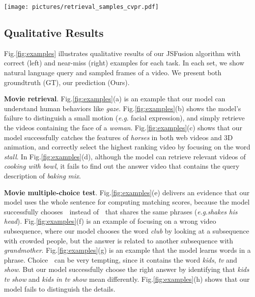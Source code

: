 \documentclass[runningheads]{llncs}
\makeatletter
\DeclareRobustCommand\onedot{\futurelet\@let@token\@onedot}
\def\onedot{.\@\xspace}
\def\eg{\textit{e.g}\onedot} \def\Eg{\textit{E.g}\onedot}
\makeatother
\begin{document}
\begin{figure*}[!t]
\centering
\texttt{[image: pictures/retrieval\_samples\_cvpr.pdf]}
\caption{Qualitative examples of the three video-language tasks:
    movie retrieval on LSMDC (a)-(b) and MSR-VTT-RET (c)-(d), multiple-choice on LSMDC (e)-(f) and MSR-VTT-MC (g)-(h), and (i)-(j) fill-in-the-blank on LSMDC.
    The left column shows correct examples, while the right column shows near-miss examples.
    In (b),(d), we show our retrieval ranks of the GT clips (in the red box).
}


\label{fig:examples}
\end{figure*}




\subsection{Qualitative Results}
\label{sec:qual_results}


Fig.\ref{fig:examples} illustrates qualitative results of our JSFusion algorithm with correct (left) and near-miss (right) examples for each task.
In each set, we show natural language query and sampled frames of a video.
We present both groundtruth (GT), our prediction (Ours).


\textbf{Movie retrieval}.
Fig.\ref{fig:examples}(a) is an example that our model can understand human behaviors like \textit{gaze}. Fig.\ref{fig:examples}(b) shows the model's failure to distinguish a small motion (\eg facial expression), and simply retrieve the videos containing the face of a \textit{woman}. 
Fig.\ref{fig:examples}(c) shows that our model successfully catches the features of \textit{horses} in both web videos and 3D animation, and correctly select the highest ranking video by focusing on the word \textit{stall}.
In Fig.\ref{fig:examples}(d), although the model can retrieve relevant videos of  \textit{cooking with bowl}, it fails to find out the answer video that contains the query description of \textit{baking mix}.

\textbf{Movie multiple-choice test}.
Fig.\ref{fig:examples}(e) delivers an evidence that our model uses the whole sentence for computing matching scores, because the model successfully chooses \textcircled{\raisebox{-0.9pt}{5}} instead of \textcircled{\raisebox{-0.9pt}{1}} that shares the same phrases (\eg \textit{shakes his head}).
Fig.\ref{fig:examples}(f) is an example of focusing on a wrong video subsequence, where our model chooses the word \textit{club} by looking at a subsequence with crowded people, 
but the answer is related to another subsequence with \textit{grandmother}. 
Fig.\ref{fig:examples}(g) is an example that the model learns words in a phrase. Choice \textcircled{\raisebox{-0.9pt}{4}} can be very tempting, since it contains the word \textit{kids}, \textit{tv} and \textit{show}. But our model successfully choose the right answer by identifying that \textit{kids tv show} and \textit{kids in tv show} mean differently.
Fig.\ref{fig:examples}(h) shows that our model fails to distinguish the details.
\end{document}
